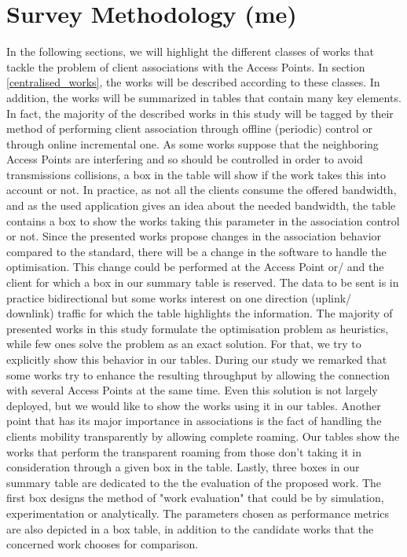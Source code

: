 \documentclass[journal,transmag]{IEEEtran}
\begin{document}
\section{Survey Methodology (me)}
\label{Taxonomies}
In the following sections, we will highlight the different classes of works that tackle the problem of client associations with the Access Points. In section \ref{centralised_works}, the works will be described according to these classes. In addition, the works will be summarized in tables that contain many key elements. In fact, the majority of the described works in this study will be tagged by their method of performing client association through offline (periodic) control or through online incremental one. As some works suppose that the neighboring Access Points are interfering and so should be controlled in order to avoid transmissions collisions, a box in the table will show if the work takes this into account or not. In practice, as not all the clients consume the offered bandwidth, and as the used application gives an idea about the needed bandwidth, the table contains a box to show the works taking this parameter in the association control or not. Since the presented works propose changes in the association behavior compared to the standard, there will be a change in the software to handle the optimisation. This change could be performed at the Access Point or/ and the client for which a box in our summary table is reserved. The data to be sent is in practice bidirectional but some works interest on one direction (uplink/ downlink) traffic for which the table highlights the information. The majority of presented works in this study formulate the optimisation problem as heuristics, while few ones solve the problem as an exact solution. For that, we try to explicitly show this behavior in our tables. During our study we remarked that some works try to enhance the resulting throughput by allowing the connection with several Access Points at the same time. Even this solution is not largely deployed, but we would like to show the works using it in our tables. Another point that has its major importance in associations is the fact of handling the clients mobility transparently by allowing complete roaming. Our tables show the works that perform the transparent roaming from those don't taking it in consideration through a given box in the table. Lastly, three boxes in our summary table are dedicated to the the evaluation of the proposed work. The first box designs the method of "work evaluation" that could be by simulation, experimentation or analytically. The parameters chosen as performance metrics are also depicted in a box table, in addition to the candidate works that the concerned work chooses for comparison.            
\end{document}
